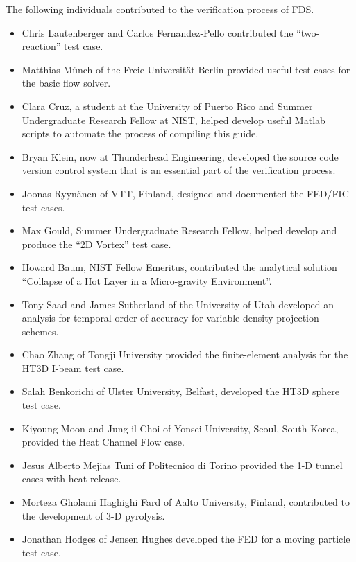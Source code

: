 \documentclass[11pt]{book}
\begin{document}
\label{acksection}

The following individuals contributed to the verification process of FDS.
\begin{itemize}
\item Chris Lautenberger and Carlos Fernandez-Pello contributed the ``two-reaction'' test case.
\item Matthias M\"{u}nch of the Freie Universit\"{a}t Berlin provided useful test cases for the basic flow solver.
\item Clara Cruz, a student at the University of Puerto Rico and Summer Undergraduate Research Fellow at NIST, helped develop useful Matlab scripts to automate the process of compiling this guide.
\item Bryan Klein, now at Thunderhead Engineering, developed the source code version control system that is an essential part of the verification process.
\item Joonas Ryyn\"{a}nen of VTT, Finland, designed and documented the FED/FIC test cases.
\item Max Gould, Summer Undergraduate Research Fellow, helped develop and produce the ``2D Vortex'' test case.
\item Howard Baum, NIST Fellow Emeritus, contributed the analytical solution ``Collapse of a Hot Layer in a Micro-gravity Environment''.
\item Tony Saad and James Sutherland of the University of Utah developed an analysis for temporal order of accuracy for variable-density projection schemes.
\item Chao Zhang of Tongji University provided the finite-element analysis for the HT3D I-beam test case.
\item Salah Benkorichi of Ulster University, Belfast, developed the HT3D sphere test case.
\item Kiyoung Moon and Jung-il Choi of Yonsei University, Seoul, South Korea, provided the Heat Channel Flow case.
\item Jesus Alberto Mejias Tuni of Politecnico di Torino provided the 1-D tunnel cases with heat release.
\item Morteza Gholami Haghighi Fard of Aalto University, Finland, contributed to the development of 3-D pyrolysis.
\item Jonathan Hodges of Jensen Hughes developed the FED for a moving particle test case.
\end{itemize}


\cleardoublepage
{}
{}
\tableofcontents
\end{document}
